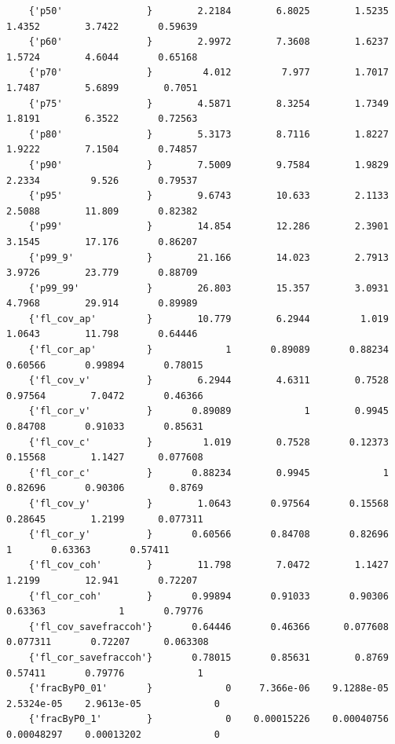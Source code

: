 \documentclass[
]{book}
\begin{document}
\begin{verbatim}
    {'p50'               }        2.2184        6.8025        1.5235        1.4352        3.7422       0.59639 
    {'p60'               }        2.9972        7.3608        1.6237        1.5724        4.6044       0.65168 
    {'p70'               }         4.012         7.977        1.7017        1.7487        5.6899        0.7051 
    {'p75'               }        4.5871        8.3254        1.7349        1.8191        6.3522       0.72563 
    {'p80'               }        5.3173        8.7116        1.8227        1.9222        7.1504       0.74857 
    {'p90'               }        7.5009        9.7584        1.9829        2.2334         9.526       0.79537 
    {'p95'               }        9.6743        10.633        2.1133        2.5088        11.809       0.82382 
    {'p99'               }        14.854        12.286        2.3901        3.1545        17.176       0.86207 
    {'p99_9'             }        21.166        14.023        2.7913        3.9726        23.779       0.88709 
    {'p99_99'            }        26.803        15.357        3.0931        4.7968        29.914       0.89989 
    {'fl_cov_ap'         }        10.779        6.2944         1.019        1.0643        11.798       0.64446 
    {'fl_cor_ap'         }             1       0.89089       0.88234       0.60566       0.99894       0.78015 
    {'fl_cov_v'          }        6.2944        4.6311        0.7528       0.97564        7.0472       0.46366 
    {'fl_cor_v'          }       0.89089             1        0.9945       0.84708       0.91033       0.85631 
    {'fl_cov_c'          }         1.019        0.7528       0.12373       0.15568        1.1427      0.077608 
    {'fl_cor_c'          }       0.88234        0.9945             1       0.82696       0.90306        0.8769 
    {'fl_cov_y'          }        1.0643       0.97564       0.15568       0.28645        1.2199      0.077311 
    {'fl_cor_y'          }       0.60566       0.84708       0.82696             1       0.63363       0.57411 
    {'fl_cov_coh'        }        11.798        7.0472        1.1427        1.2199        12.941       0.72207 
    {'fl_cor_coh'        }       0.99894       0.91033       0.90306       0.63363             1       0.79776 
    {'fl_cov_savefraccoh'}       0.64446       0.46366      0.077608      0.077311       0.72207      0.063308 
    {'fl_cor_savefraccoh'}       0.78015       0.85631        0.8769       0.57411       0.79776             1 
    {'fracByP0_01'       }             0     7.366e-06    9.1288e-05    2.5324e-05    2.9613e-05             0 
    {'fracByP0_1'        }             0    0.00015226    0.00040756    0.00048297    0.00013202             0 

\end{verbatim}
\end{document}
